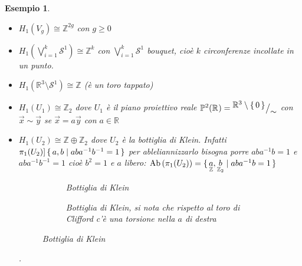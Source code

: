 \documentclass[10pt, twoside=false, x11names]{scrbook}
\newtheorem{example}[theorem]{Esempio}
\newcommand{\Z}{\mathbb{Z}}
\newcommand{\RN}[1][]{\mathbb{R}^#1}
\newcommand{\Sph}[1][]{\mathcal{S}^#1}
\newcommand{\Ab}[1]{\mathrm{Ab}\left( #1 \right)}
\newcommand*\quot[2]{{^{\textstyle #1}\big/_{\textstyle #2}}}
\begin{document}
\begin{example} \hfill
  \begin{itemize}
  \item $ H_1(V_g) \cong \Z^{2g} $ con $ g \geq 0 $
  \item $ H_1(\bigvee_{i=1}^{k}\Sph{1}) \cong \Z^k $ con $ \bigvee_{i=1}^{k}\Sph{1} $ bouquet, cioè $ k $ circonferenze incollate in un punto.
  \item $ H_1(\RN{3} \setminus \Sph{1}) \cong \Z $ (è un toro tappato)
  \item $ H_1(U_1) \cong \Z_2 $ dove $ U_1 $ è il piano proiettivo reale $ \mathbb{P}^2(\RN{}) = \quot{\RN{3} \setminus \set{0}}{\sim} $
    con $ \vec{x} \sim \vec{y} $ se $ \vec{x} = a \vec{y} $ con $ a \in \RN{} $
  \item $ H_1(U_2) \cong \Z \oplus \Z_2 $ dove $ U_2 $ è la bottiglia di Klein.
    Infatti $ \pi_1(U_2) ] \set{a, b | aba^{-1}b^{-1} = 1} $ per ableliannizzarlo bisogna
    porre $ aba^{-1}b = 1 $ e $ aba^{-1}b^{-1} = 1 $ cioè $ b^2 = 1 $ e $ a $ libero:
    $ \Ab{\pi_1(U_2)} = \set{\underset{\Z}{a}, \underset{\Z_2}{b} |  aba^{-1}b = 1 } $
    \begin{figure}[htbp]
      \centering
      \begin{subfigure}{.5\textwidth}
        \centering
        \def\svgwidth{0.26\textwidth}
        
        \caption{Bottiglia di Klein}
      \end{subfigure}%
      \begin{subfigure}{.5\textwidth}
        \centering
        \caption{Bottiglia di Klein, si nota che rispetto al toro di Clifford c'è
          una torsione nella $ a $ di destra}
      \end{subfigure}
      \caption{Bottiglia di Klein}
      \label{fig:lez3:klein_bottle}
    \end{figure}.
  \end{itemize}
\end{example}

\end{document}
